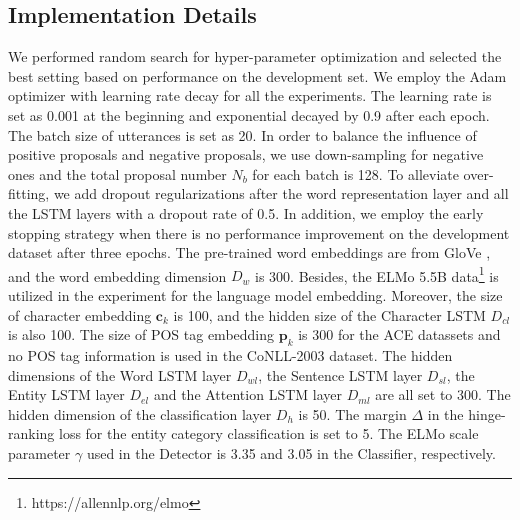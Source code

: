 \documentclass[11pt,a4paper]{article}
\begin{document}
\subsection{Implementation Details}
We performed random search \cite{bergstra2012random} for hyper-parameter optimization and selected the best setting based on performance on the development set.
We employ the Adam optimizer \cite{kingma2014adam} with learning rate decay for all the experiments. The learning rate is set as 0.001 at the beginning and exponential decayed by 0.9 after each epoch.
The batch size of utterances is set as 20. In order to balance the influence of positive proposals and negative proposals, we use down-sampling for negative ones and the total proposal number $N_b$ for each batch is 128.
To alleviate over-fitting, we add dropout regularizations after the word representation layer and all the LSTM layers with a dropout rate of 0.5.
In addition, we employ the early stopping strategy when there is no performance improvement on the development dataset after three epochs.
The pre-trained word embeddings are from GloVe \cite{pennington2014glove}, and the word embedding dimension $D_w$ is 300. Besides, the ELMo 5.5B data\footnote{https://allennlp.org/elmo} is utilized in the experiment for the language model embedding. 
Moreover, the size of character embedding  $\mathbf{c}_k$ is 100, and the hidden size of the Character LSTM $D_{cl}$ is also 100.
The size of POS tag embedding $\mathbf{p}_{k}$ is 300 for the ACE datassets and no POS tag information is used in the CoNLL-2003 dataset. 
The hidden dimensions of the Word LSTM layer $D_{wl}$, the Sentence LSTM layer $D_{sl}$, the Entity LSTM layer $D_{el}$ and the Attention LSTM layer $D_{ml}$ are all set to 300. 
The hidden dimension of the classification layer $D_h$ is 50. The margin $\Delta$ in the hinge-ranking loss for the entity category classification is set to 5.
The ELMo scale parameter $\gamma$ used in the Detector is 3.35 and 3.05 in the Classifier, respectively.
\end{document}
